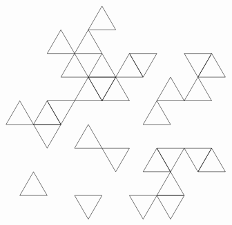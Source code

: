 \documentclass{article}\usepackage{tikz}
\begin{document}
\[\begin{tikzpicture}
\draw (1.0,0.0)--(2.0,0.0)--(1.5,0.8660254037844386)--cycle;
\draw (-1.0,0.0)--(-0.5,-0.8660254037844386)--(-1.5,-0.8660254037844386)--cycle;
\draw (-2.0,0.0)--(-2.5,0.8660254037844386)--(-1.5,0.8660254037844386)--cycle;
\draw (-0.5,-0.8660254037844386)--(0.5,-0.8660254037844386)--(0.0,-1.7320508075688772)--cycle;
\draw (2.0,-1.7320508075688772)--(1.0,-1.7320508075688772)--(1.5,-0.8660254037844386)--cycle;
\draw (0.5,2.598076211353316)--(1.5,2.598076211353316)--(1.0,1.7320508075688772)--cycle;
\draw (2.5,0.8660254037844386)--(3.5,0.8660254037844386)--(3.0,1.7320508075688772)--cycle;
\draw (2.5,0.8660254037844386)--(2.0,1.7320508075688772)--(1.5,0.8660254037844386)--cycle;
\draw (-0.5,0.8660254037844386)--(-1.5,0.8660254037844386)--(-1.0,1.7320508075688772)--cycle;
\draw (-1.5,-2.598076211353316)--(-0.5,-2.598076211353316)--(-1.0,-3.4641016151377544)--cycle;
\draw (0.5,2.598076211353316)--(0.0,1.7320508075688772)--(1.0,1.7320508075688772)--cycle;
\draw (2.0,-3.4641016151377544)--(1.5,-2.598076211353316)--(2.5,-2.598076211353316)--cycle;
\draw (-0.5,0.8660254037844386)--(-1.0,1.7320508075688772)--(0.0,1.7320508075688772)--cycle;
\draw (3.5,2.598076211353316)--(3.0,1.7320508075688772)--(2.5,2.598076211353316)--cycle;
\draw (-2.5,2.598076211353316)--(-1.5,2.598076211353316)--(-2.0,3.4641016151377544)--cycle;
\draw (-1.0,1.7320508075688772)--(0.0,1.7320508075688772)--(-0.5,2.598076211353316)--cycle;
\draw (1.0,-3.4641016151377544)--(1.5,-2.598076211353316)--(0.5,-2.598076211353316)--cycle;
\draw (1.5,-2.598076211353316)--(2.5,-2.598076211353316)--(2.0,-1.7320508075688772)--cycle;
\draw (-0.5,0.8660254037844386)--(0.5,0.8660254037844386)--(0.0,1.7320508075688772)--cycle;
\draw (-2.0,0.0)--(-2.5,0.8660254037844386)--(-3.0,0.0)--cycle;
\draw (-3.0,-1.7320508075688772)--(-3.5,-2.598076211353316)--(-2.5,-2.598076211353316)--cycle;
\draw (3.0,-1.7320508075688772)--(3.5,-0.8660254037844386)--(2.5,-0.8660254037844386)--cycle;
\draw (-4.0,0.0)--(-3.0,0.0)--(-3.5,0.8660254037844386)--cycle;
\draw (3.0,-1.7320508075688772)--(4.0,-1.7320508075688772)--(3.5,-0.8660254037844386)--cycle;
\draw (3.5,2.598076211353316)--(3.0,1.7320508075688772)--(4.0,1.7320508075688772)--cycle;
\draw (-1.0,1.7320508075688772)--(-2.0,1.7320508075688772)--(-1.5,2.598076211353316)--cycle;
\draw (2.5,-0.8660254037844386)--(1.5,-0.8660254037844386)--(2.0,-1.7320508075688772)--cycle;
\draw (-1.5,2.598076211353316)--(-0.5,2.598076211353316)--(-1.0,3.4641016151377544)--cycle;
\draw (0.0,3.4641016151377544)--(-0.5,4.330127018922193)--(-1.0,3.4641016151377544)--cycle;
\draw (-2.0,0.0)--(-2.5,-0.8660254037844386)--(-3.0,0.0)--cycle;

\end{tikzpicture}\]
\end{document}
